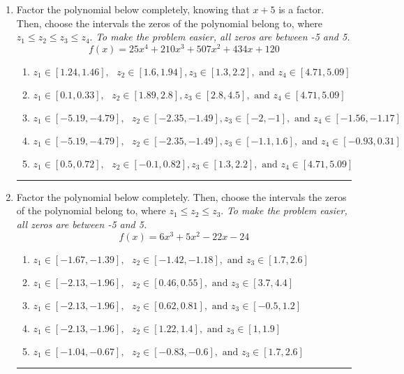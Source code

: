 \documentclass[14pt]{extbook}
\newcommand{\litem}[1]{\item#1\hspace*{-1cm}\rule{\textwidth}{0.4pt}}
\begin{document}
\begin{enumerate}
{\begin{enumerate}[label=\Alph*.]
\end{enumerate} }
\litem{
Factor the polynomial below completely, knowing that $x + 5$ is a factor. Then, choose the intervals the zeros of the polynomial belong to, where $z_1 \leq z_2 \leq z_3 \leq z_4$. \textit{To make the problem easier, all zeros are between -5 and 5.}\[ f(x) = 25x^{4} +210 x^{3} +507 x^{2} +434 x + 120 \]\begin{enumerate}[label=\Alph*.]
\item \( z_1 \in [1.24, 1.46], \text{   }  z_2 \in [1.6, 1.94], z_3 \in [1.3, 2.2], \text{   and   } z_4 \in [4.71, 5.09] \)
\item \( z_1 \in [0.1, 0.33], \text{   }  z_2 \in [1.89, 2.8], z_3 \in [2.8, 4.5], \text{   and   } z_4 \in [4.71, 5.09] \)
\item \( z_1 \in [-5.19, -4.79], \text{   }  z_2 \in [-2.35, -1.49], z_3 \in [-2, -1], \text{   and   } z_4 \in [-1.56, -1.17] \)
\item \( z_1 \in [-5.19, -4.79], \text{   }  z_2 \in [-2.35, -1.49], z_3 \in [-1.1, 1.6], \text{   and   } z_4 \in [-0.93, 0.31] \)
\item \( z_1 \in [0.5, 0.72], \text{   }  z_2 \in [-0.1, 0.82], z_3 \in [1.3, 2.2], \text{   and   } z_4 \in [4.71, 5.09] \)

\end{enumerate} }
\litem{
Factor the polynomial below completely. Then, choose the intervals the zeros of the polynomial belong to, where $z_1 \leq z_2 \leq z_3$. \textit{To make the problem easier, all zeros are between -5 and 5.}\[ f(x) = 6x^{3} +5 x^{2} -22 x -24 \]\begin{enumerate}[label=\Alph*.]
\item \( z_1 \in [-1.67, -1.39], \text{   }  z_2 \in [-1.42, -1.18], \text{   and   } z_3 \in [1.7, 2.6] \)
\item \( z_1 \in [-2.13, -1.96], \text{   }  z_2 \in [0.46, 0.55], \text{   and   } z_3 \in [3.7, 4.4] \)
\item \( z_1 \in [-2.13, -1.96], \text{   }  z_2 \in [0.62, 0.81], \text{   and   } z_3 \in [-0.5, 1.2] \)
\item \( z_1 \in [-2.13, -1.96], \text{   }  z_2 \in [1.22, 1.4], \text{   and   } z_3 \in [1, 1.9] \)
\item \( z_1 \in [-1.04, -0.67], \text{   }  z_2 \in [-0.83, -0.6], \text{   and   } z_3 \in [1.7, 2.6] \)


\end{enumerate}}
\end{enumerate}
\end{document}
